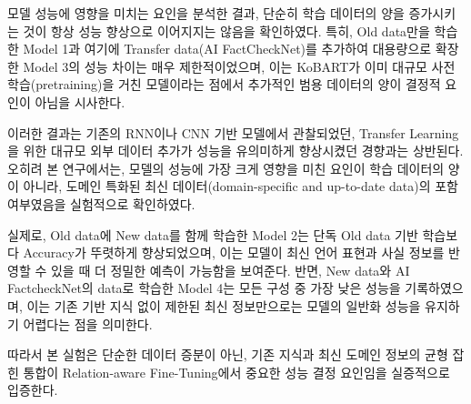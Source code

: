 \documentclass[a4paper,fleqn]{cas-sc}
\begin{document}
모델 성능에 영향을 미치는 요인을 분석한 결과, 단순히 학습 데이터의 양을 증가시키는 것이 항상 성능 향상으로 이어지지는 않음을 확인하였다. 특히, Old data만을 학습한 Model 1과 여기에 Transfer data(AI FactCheckNet)를 추가하여 대용량으로 확장한 Model 3의 성능 차이는 매우 제한적이었으며, 이는 KoBART가 이미 대규모 사전 학습(pretraining)을 거친 모델이라는 점에서 추가적인 범용 데이터의 양이 결정적 요인이 아님을 시사한다.

이러한 결과는 기존의 RNN이나 CNN 기반 모델에서 관찰되었던, Transfer Learning을 위한 대규모 외부 데이터 추가가 성능을 유의미하게 향상시켰던 경향과는 상반된다. 오히려 본 연구에서는, 모델의 성능에 가장 크게 영향을 미친 요인이 학습 데이터의 양이 아니라, 도메인 특화된 최신 데이터(domain-specific and up-to-date data)의 포함 여부였음을 실험적으로 확인하였다.

실제로, Old data에 New data를 함께 학습한 Model 2는 단독 Old data 기반 학습보다 Accuracy가 뚜렷하게 향상되었으며, 이는 모델이 최신 언어 표현과 사실 정보를 반영할 수 있을 때 더 정밀한 예측이 가능함을 보여준다. 반면, New data와 AI FactcheckNet의 data로 학습한 Model 4는 모든 구성 중 가장 낮은 성능을 기록하였으며, 이는 기존 기반 지식 없이 제한된 최신 정보만으로는 모델의 일반화 성능을 유지하기 어렵다는 점을 의미한다.

따라서 본 실험은 단순한 데이터 증분이 아닌, 기존 지식과 최신 도메인 정보의 균형 잡힌 통합이 Relation-aware Fine-Tuning에서 중요한 성능 결정 요인임을 실증적으로 입증한다.


\end{document}
